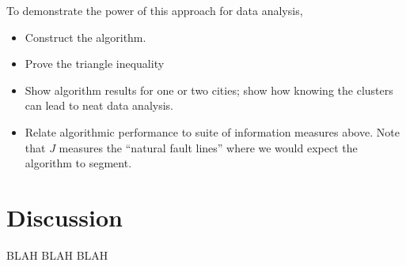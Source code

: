 \documentclass[english]{scrartcl}
\begin{document}
	To demonstrate the power of this approach for data analysis, 



	\begin{itemize}
		\item Construct the algorithm. 
		\item Prove the triangle inequality
		\item Show algorithm results for one or two cities; show how knowing the clusters can lead to neat data analysis. 
		\item Relate algorithmic performance to suite of information measures above. Note that $J$ measures the ``natural fault lines'' where we would expect the algorithm to segment.  
	\end{itemize}

\section{Discussion} \label{sec:discussion}
BLAH BLAH BLAH
% 



\end{document}
